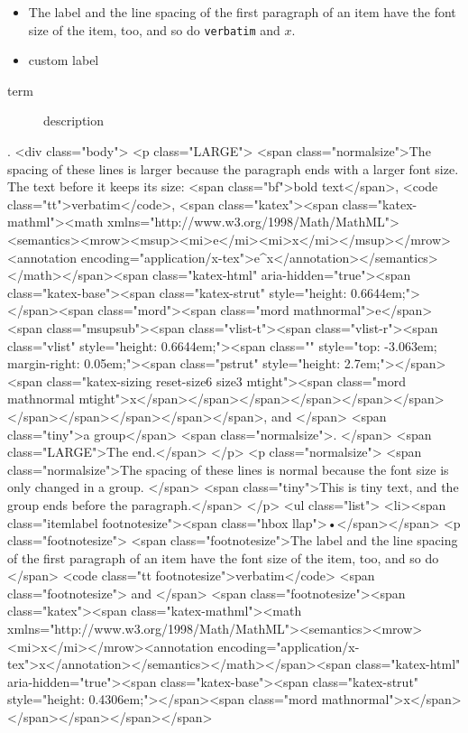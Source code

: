 \footnotesize
\begin{itemize}
    \item The label and the line spacing of the first paragraph of an item have the font size of the item, too, and
        so do \verb|verbatim| and $x$.
    \item[$\ast$] custom label
\end{itemize}
\begin{description}
    \item[term] description
\end{description}
.
<div class="body">
<p class="LARGE">
<span class="normalsize">The spacing of these lines is larger because the paragraph ends with a larger font size. The text before it keeps its size: <span class="bf">bold text</span>, <code class="tt">verbatim</code>, <span class="katex"><span class="katex-mathml"><math xmlns="http://www.w3.org/1998/Math/MathML"><semantics><mrow><msup><mi>e</mi><mi>x</mi></msup></mrow><annotation encoding="application/x-tex">e^x</annotation></semantics></math></span><span class="katex-html" aria-hidden="true"><span class="katex-base"><span class="katex-strut" style="height: 0.6644em;"></span><span class="mord"><span class="mord mathnormal">e</span><span class="msupsub"><span class="vlist-t"><span class="vlist-r"><span class="vlist" style="height: 0.6644em;"><span class="" style="top: -3.063em; margin-right: 0.05em;"><span class="pstrut" style="height: 2.7em;"></span><span class="katex-sizing reset-size6 size3 mtight"><span class="mord mathnormal mtight">x</span></span></span></span></span></span></span></span></span></span></span>, and </span>
<span class="tiny">a group</span>
<span class="normalsize">. </span>
<span class="LARGE">The end.</span>
</p>
<p class="normalsize">
<span class="normalsize">The spacing of these lines is normal because the font size is only changed in a group. </span>
<span class="tiny">This is tiny text, and the group ends before the paragraph.</span>
</p>
<ul class="list">
<li><span class="itemlabel footnotesize"><span class="hbox llap">•</span></span>
<p class="footnotesize">
<span class="footnotesize">The label and the line spacing of the ﬁrst paragraph of an item have the font size of the item, too, and so do </span>
<code class="tt footnotesize">verbatim</code>
<span class="footnotesize"> and </span>
<span class="footnotesize"><span class="katex"><span class="katex-mathml"><math xmlns="http://www.w3.org/1998/Math/MathML"><semantics><mrow><mi>x</mi></mrow><annotation encoding="application/x-tex">x</annotation></semantics></math></span><span class="katex-html" aria-hidden="true"><span class="katex-base"><span class="katex-strut" style="height: 0.4306em;"></span><span class="mord mathnormal">x</span></span></span></span></span>
